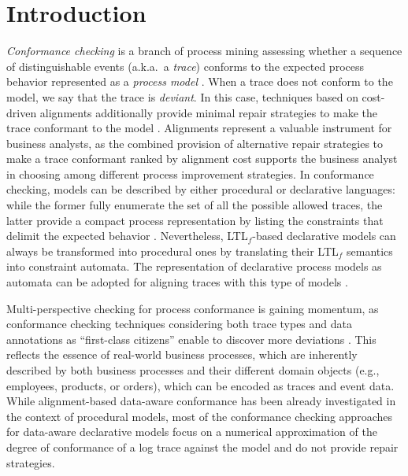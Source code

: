 \section{Introduction}
\label{sec:introduction}

\textit{Conformance checking} is a branch of process mining  assessing whether a sequence of distinguishable events (a.k.a.\ a \textit{trace}) conforms to the expected process behavior represented as a \textit{process model} \cite{RozinatA08}. When a trace does not conform to the model, we say that the trace is \textit{deviant}. In this case, techniques based on cost-driven alignments additionally provide minimal repair strategies to make the trace conformant to the model \cite{LeoniA13}. Alignments represent a valuable instrument for business analysts, as the combined provision of alternative repair strategies to make a trace conformant ranked by alignment cost supports the business analyst in choosing among different process improvement strategies. In conformance checking, models can be described by either procedural or declarative languages: while the former fully enumerate the set of all the possible allowed traces, the latter provide a compact process representation by listing the constraints that delimit the expected behavior \cite{LeoniA13,Westergaard11}. Nevertheless, LTL$_f$-based declarative models can always be transformed into procedural ones by translating their LTL$_f$ semantics into constraint automata.
The representation of declarative process models as automata can be adopted for aligning traces with this type of models \cite{LeoniMA12,XuLZ17a}.


Multi-perspective checking for process conformance is gaining momentum, as conformance checking techniques considering both trace types and data annotations as ``first-class citizens'' enable to discover more deviations \cite{MultiPerspective}. This reflects the essence of real-world business processes, which are inherently described by both business processes and their different domain objects \cite{PetermannJMR14} (e.g., employees, products, or orders), which can be encoded as traces and event data. While alignment-based  data-aware conformance has been already investigated in the context of procedural models, most of the conformance checking approaches for data-aware declarative models \cite{BurattinMS16,Borrego014} focus on a numerical approximation of the degree of conformance of a log trace against the model and do not provide repair strategies.

